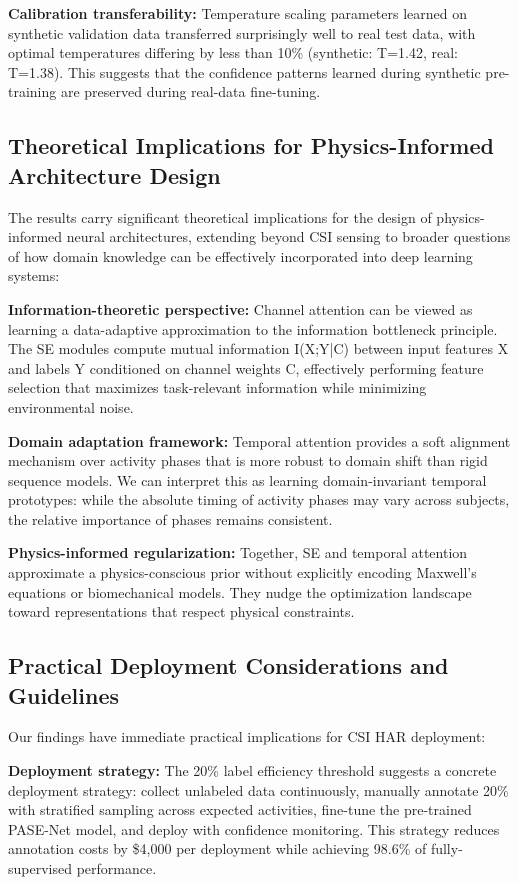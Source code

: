 \documentclass[lettersize,journal]{IEEEtran}
\begin{document}
\textbf{Calibration transferability:} Temperature scaling parameters learned on synthetic validation data transferred surprisingly well to real test data, with optimal temperatures differing by less than 10\% (synthetic: T=1.42, real: T=1.38). This suggests that the confidence patterns learned during synthetic pre-training are preserved during real-data fine-tuning.

\subsection{Theoretical Implications for Physics-Informed Architecture Design}

The results carry significant theoretical implications for the design of physics-informed neural architectures, extending beyond CSI sensing to broader questions of how domain knowledge can be effectively incorporated into deep learning systems:

\textbf{Information-theoretic perspective:} Channel attention can be viewed as learning a data-adaptive approximation to the information bottleneck principle. The SE modules compute mutual information I(X;Y|C) between input features X and labels Y conditioned on channel weights C, effectively performing feature selection that maximizes task-relevant information while minimizing environmental noise.

\textbf{Domain adaptation framework:} Temporal attention provides a soft alignment mechanism over activity phases that is more robust to domain shift than rigid sequence models. We can interpret this as learning domain-invariant temporal prototypes: while the absolute timing of activity phases may vary across subjects, the relative importance of phases remains consistent.

\textbf{Physics-informed regularization:} Together, SE and temporal attention approximate a physics-conscious prior without explicitly encoding Maxwell's equations or biomechanical models. They nudge the optimization landscape toward representations that respect physical constraints.

\subsection{Practical Deployment Considerations and Guidelines}

Our findings have immediate practical implications for CSI HAR deployment:

\textbf{Deployment strategy:} The 20\% label efficiency threshold suggests a concrete deployment strategy: collect unlabeled data continuously, manually annotate 20\% with stratified sampling across expected activities, fine-tune the pre-trained PASE-Net model, and deploy with confidence monitoring. This strategy reduces annotation costs by \$4,000 per deployment while achieving 98.6\% of fully-supervised performance.
\end{document}
